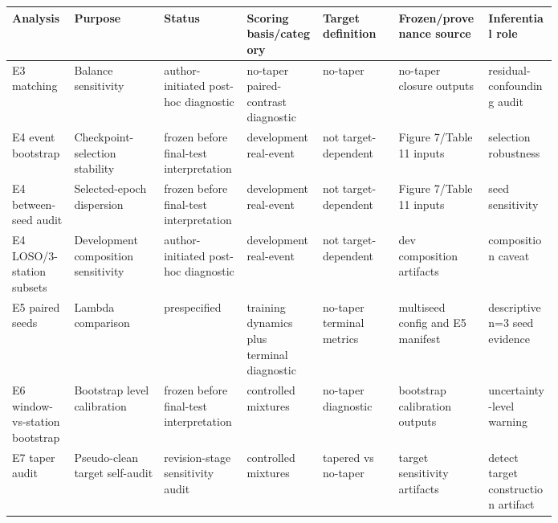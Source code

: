 \par\medskip
\pagebreak[2]
\begin{tabular}{@{}p{0.09\linewidth}p{0.13\linewidth}p{0.12\linewidth}p{0.11\linewidth}p{0.11\linewidth}p{0.13\linewidth}p{0.10\linewidth}@{}}
\toprule
Analysis & Purpose & Status & Scoring basis/category & Target definition & Frozen/provenance source & Inferential role \\
\midrule
E3 matching & Balance sensitivity & author-initiated post-hoc diagnostic & no-taper paired-contrast diagnostic & no-taper & no-taper closure outputs & residual-confounding audit \\
E4 event bootstrap & Checkpoint-selection stability & frozen before final-test interpretation & development real-event & not target-dependent & Figure 7/Table 11 inputs & selection robustness \\
E4 between-seed audit & Selected-epoch dispersion & frozen before final-test interpretation & development real-event & not target-dependent & Figure 7/Table 11 inputs & seed sensitivity \\
E4 LOSO/3-station subsets & Development composition sensitivity & author-initiated post-hoc diagnostic & development real-event & not target-dependent & dev composition artifacts & composition caveat \\
E5 paired seeds & Lambda comparison & prespecified & training dynamics plus terminal diagnostic & no-taper terminal metrics & multiseed config and E5 manifest & descriptive n=3 seed evidence \\
E6 window-vs-station bootstrap & Bootstrap level calibration & frozen before final-test interpretation & controlled mixtures & no-taper diagnostic & bootstrap calibration outputs & uncertainty-level warning \\
E7 taper audit & Pseudo-clean target self-audit & revision-stage sensitivity audit & controlled mixtures & tapered vs no-taper & target sensitivity artifacts & detect target construction artifact \\
\bottomrule
\end{tabular}

